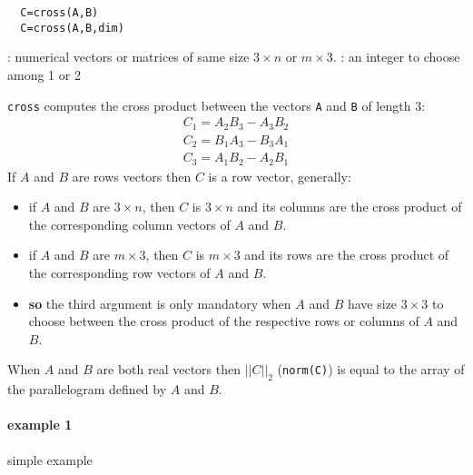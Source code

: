 \begin{mandesc}
\end{mandesc}
\begin{calling_sequence}
\begin{verbatim}
  C=cross(A,B)  
  C=cross(A,B,dim)  
\end{verbatim}
\end{calling_sequence}
\begin{parameters}
  \begin{varlist}
    : numerical vectors or matrices of same size $3 \times n$ or $m \times 3$. 
    : an integer to choose among 1 or 2
  \end{varlist}
\end{parameters}
\begin{mandescription}
  \verb+cross+ computes the cross product between the vectors \verb+A+ and \verb+B+ of length 3:
$$
\begin{array}{l}
     C_1 = A_2 B_3 - A_3 B_2 \\
     C_2 = B_1 A_3 - B_3 A_1 \\
     C_3 = A_1 B_2 - A_2 B_1
\end{array}
$$
 If  $A$ and $B$ are rows vectors then $C$ is a row vector, generally:
 \begin{itemize}
 \item if $A$ and $B$ are $3 \times n$, then $C$ is $3 \times n$ and its columns are the 
 cross product  of the corresponding column vectors of  $A$ and $B$.
 \item if $A$ and $B$ are $m \times 3$, then $C$ is $m \times 3$ and its rows are the 
 cross product  of the corresponding row vectors of  $A$ and $B$.
 \item {\bf so} the third argument is only mandatory when  $A$ and $B$ have size $3 \times 3$
 to choose between the cross product of the respective rows or columns of $A$ and $B$.
\end{itemize}
When $A$ and $B$ are both real vectors then $|| C ||_2$ (\verb+norm(C)+) is equal to the 
array of the parallelogram defined by $A$ and $B$.   
\end{mandescription}

\begin{examples}
\paragraph{example 1} simple example
  \begin{program}
  \end{program}
\end{examples}

\begin{manseealso}
\end{manseealso}

